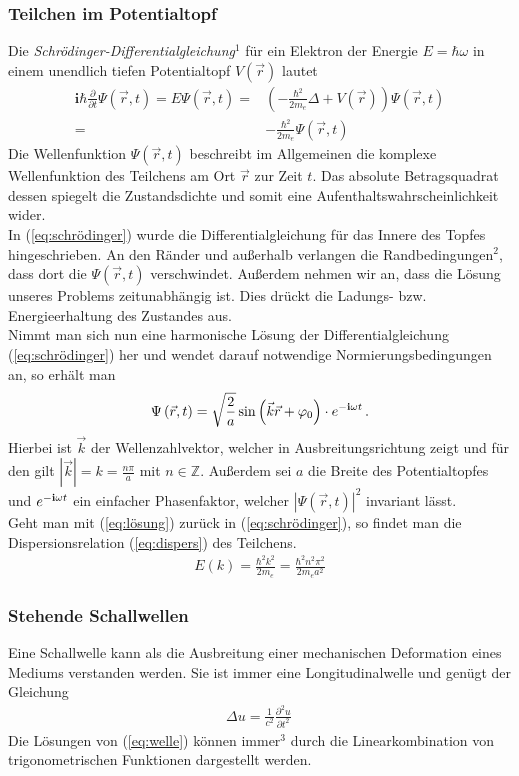 \documentclass[numbers=noenddot,12pt,a4paper]{scrartcl}
\newcommand{\imag}{\mathbf{i}}
\newcommand{\euler}{\mathnormal{e}}
\newcommand{\wellenfunktion}{\Psi\left(\vec{r},t\right)}
\begin{document}
\subsubsection{Teilchen im Potentialtopf}
Die \textit{Schrödinger-Differentialgleichung}$^{1}$ für ein Elektron der Energie $E=\hbar\omega$ in einem unendlich tiefen Potentialtopf $V\left(\vec{r}\right)$ lautet
\begin{align}
	\imag \hbar \frac{\partial}{\partial t}\Psi\left(\vec{r},t\right)=E\Psi\left(\vec{r},t\right)=&\left(-\frac{\hbar^2}{2 m_e}\Delta+V\left(\vec{r}\right)\right)\Psi\left(\vec{r},t\right) \nonumber \\ 
	=&-\frac{\hbar^2}{2 m_e}\Psi\left(\vec{r},t\right) \label{eq:schrödinger}
	\end{align}
Die Wellenfunktion $\Psi\left(\vec{r},t\right)$ beschreibt im Allgemeinen die komplexe Wellenfunktion des Teilchens am Ort $\vec{r}$ zur Zeit $t$. Das absolute Betragsquadrat dessen spiegelt die Zustandsdichte und somit eine Aufenthaltswahrscheinlichkeit wider. \\
In (\ref{eq:schrödinger}) wurde die Differentialgleichung für das Innere des Topfes hingeschrieben. An den Ränder und außerhalb verlangen die Randbedingungen$^{2}$, dass dort die $\Psi\left(\vec{r},t\right)$ verschwindet. Außerdem nehmen wir an, dass die Lösung unseres Problems zeitunabhängig ist. Dies drückt die Ladungs- bzw. Energieerhaltung des Zustandes aus.\\
Nimmt man sich nun eine harmonische Lösung der Differentialgleichung (\ref{eq:schrödinger}) her und wendet darauf notwendige Normierungsbedingungen an, so erhält man
\begin{align}
	\Psi\left(\vec{r},t\right)=\sqrt{\frac{2}{a}}\sin\left(\vec{k}\vec{r}+\varphi_0\right)\cdot\euler^{-\imag\omega t} \, . \label{eq:lösung}
\end{align}
Hierbei ist $\vec{k}$ der Wellenzahlvektor, welcher in Ausbreitungsrichtung zeigt und für den gilt $|\vec{k}|=k=\frac{n\pi}{a}$ mit $n\in\mathbb{Z}$. Außerdem sei $a$ die Breite des Potentialtopfes und $\euler^{-\imag\omega t}$ ein einfacher Phasenfaktor, welcher $|\wellenfunktion|^2$ invariant lässt.\\
Geht man mit (\ref{eq:lösung}) zurück in (\ref{eq:schrödinger}), so findet man die Dispersionsrelation (\ref{eq:dispers}) des Teilchens.
\begin{align}
	E\left(k\right)=\frac{\hbar^2 k^2}{2m_e}=\frac{\hbar^2n^2\pi^2}{2m_e a^2} \label{eq:dispers}
\end{align}
\subsubsection{Stehende Schallwellen}
Eine Schallwelle kann als die Ausbreitung einer mechanischen Deformation eines Mediums verstanden werden. Sie ist immer eine Longitudinalwelle und genügt der Gleichung
\begin{align}
\Delta u=\frac{1}{c^2}\frac{\partial^2 u}{\partial t^2} \, \label{eq:welle}
\end{align}
Die Lösungen von (\ref{eq:welle}) können immer$^3$ durch die Linearkombination von trigonometrischen Funktionen dargestellt werden.
\end{document}
